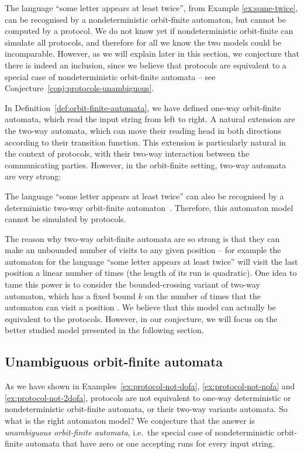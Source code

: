 \begin{myexample}
     \label{ex:protocol-not-nofa}  
    The language ``some letter appears at least twice'', from Example \ref{ex:some-twice}, can be recognised by a nondeterministic orbit-finite automaton, but cannot be computed by a protocol. We do not know yet if nondeterministic orbit-finite can simulate all protocols, and therefore for all we know the two models could be incomparable. However, as we will explain later in this section, we conjecture that there is indeed an inclusion, since we believe that protocols are equivalent to a special case of nondeterministic orbit-finite automata -- see Conjecture~\ref{conj:protocols-unambiguous}.
\end{myexample}

In Definition~\ref{def:orbit-finite-automata}, we have defined one-way orbit-finite automata, which read the input string from left to right. A natural extension are the two-way automata, which can move their reading head in both directions according to their transition
function. This extension is particularly natural in the context of protocols, with their two-way interaction between the communicating parties.  However, in the orbit-finite setting, two-way automata are very strong:

\begin{myexample}\label{ex:protocol-not-2dofa}
    The language ``some letter appears at least twice'' can also be recognised by a deterministic two-way orbit-finite automaton~\cite[Example 18]{bojanczyk_slightly}. Therefore, this automaton model cannot be simulated by protocols.

    The reason why two-way orbit-finite automata are so strong is that they can make an unbounded number of visits to any given position -- for example the automaton for the language ``some letter appears at least twice'' will visit the last position a linear number of times
    (the length of its run is quadratic). One idea to tame this power is to consider the bounded-crossing variant of two-way automaton, 
    which has a fixed bound $k$ on the number of times that the automaton can visit a position \cite[p.~92]{neven2003power}.
    We believe that this model can actually be equivalent to the protocols. However, in our conjecture, we will focus on the 
    better studied model presented in the following section.
\end{myexample}

\subsection{Unambiguous orbit-finite automata}
\label{sec:unambiguous-orbit-finite-automata}
As we have shown in Examples~\ref{ex:protocol-not-dofa}, \ref{ex:protocol-not-nofa} and \ref{ex:protocol-not-2dofa}, protocols are not equivalent to one-way deterministic or nondeterministic orbit-finite automata, or their two-way variants automata. So what is the right automaton model?  We conjecture that the answer is  \emph{unambiguous orbit-finite automata}, i.e.~the special case of nondeterministic orbit-finite automata that have zero or one accepting runs for every input string.

